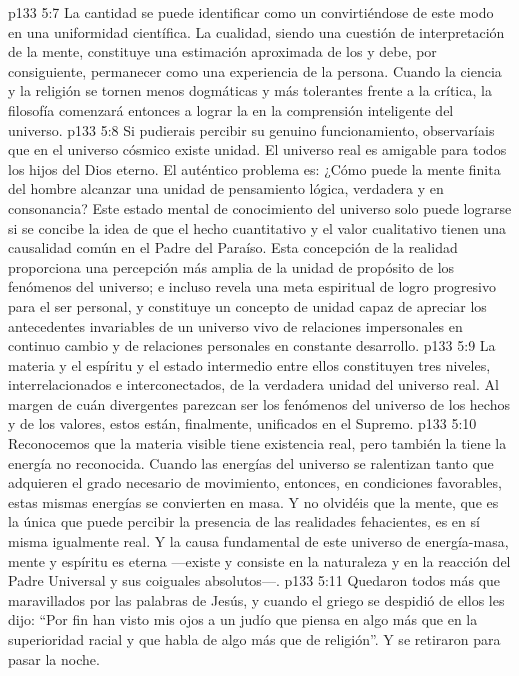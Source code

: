 \vs p133 5:7 La cantidad se puede identificar como un  convirtiéndose de este modo en una uniformidad científica. La cualidad, siendo una cuestión de interpretación de la mente, constituye una estimación aproximada de los  y debe, por consiguiente, permanecer como una experiencia de la persona. Cuando la ciencia y la religión se tornen menos dogmáticas y más tolerantes frente a la crítica, la filosofía comenzará entonces a lograr la  en la comprensión inteligente del universo.
\vs p133 5:8 Si pudierais percibir su genuino funcionamiento, observaríais que en el universo cósmico existe unidad. El universo real es amigable para todos los hijos del Dios eterno. El auténtico problema es: ¿Cómo puede la mente finita del hombre alcanzar una unidad de pensamiento lógica, verdadera y en consonancia? Este estado mental de conocimiento del universo solo puede lograrse si se concibe la idea de que el hecho cuantitativo y el valor cualitativo tienen una causalidad común en el Padre del Paraíso. Esta concepción de la realidad proporciona una percepción más amplia de la unidad de propósito de los fenómenos del universo; e incluso revela una meta espiritual de logro progresivo para el ser personal, y constituye un concepto de unidad capaz de apreciar los antecedentes invariables de un universo vivo de relaciones impersonales en continuo cambio y de relaciones personales en constante desarrollo.
\vs p133 5:9 La materia y el espíritu y el estado intermedio entre ellos constituyen tres niveles, interrelacionados e interconectados, de la verdadera unidad del universo real. Al margen de cuán divergentes parezcan ser los fenómenos del universo de los hechos y de los valores, estos están, finalmente, unificados en el Supremo.
\vs p133 5:10 Reconocemos que la materia visible tiene existencia real, pero también la tiene la energía no reconocida. Cuando las energías del universo se ralentizan tanto que adquieren el grado necesario de movimiento, entonces, en condiciones favorables, estas mismas energías se convierten en masa. Y no olvidéis que la mente, que es la única que puede percibir la presencia de las realidades fehacientes, es en sí misma igualmente real. Y la causa fundamental de este universo de energía\hyp{}masa, mente y espíritu es eterna ---existe y consiste en la naturaleza y en la reacción del Padre Universal y sus coiguales absolutos---.
\vs p133 5:11 \pc Quedaron todos más que maravillados por las palabras de Jesús, y cuando el griego se despidió de ellos les dijo: “Por fin han visto mis ojos a un judío que piensa en algo más que en la superioridad racial y que habla de algo más que de religión”. Y se retiraron para pasar la noche.
